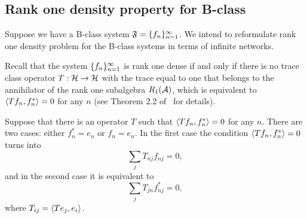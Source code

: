 \documentclass[12pt,oneside,a4paper]{amsart}
\begin{document}


    \medskip
    \subsection{Rank one density property for B-class}
      Suppose we have a B-class system $\fsys=\seq{f}$.
      We intend to reformulate rank one density problem for the B-class systems in terms of infinite networks.

      Recall that the system $\seq{f}$ is rank one dense
        if and only if there is no trace class operator $T: \cal{H} \to \cal{H}$ with the trace equal to one
        that belongs to the annihilator of the rank one subalgebra $R_1(\cal{A})$, which is equivalent to
        $\inner{Tf_n}{f_n^*} = 0$ for any $n$
        (see Theorem 2.2 of~\cite{katavolos} for details).

      Suppose that there is an operator $T$ such that $\inner{Tf_n}{f_n^*} = 0$ for any $n$.
      There are two cases: either $f^*_n = e_n$ or $f_n = e_n$.
      In the first case the condition $\inner{Tf_n}{f_n^*} = 0$ turns into
      \begin{equation}
          \label{left-eqn}
          \sum_j T_{nj} f_{nj} = 0,
      \end{equation}
      and in the second case it is equivalent to
      \begin{equation}
          \label{right-eqn}
          \sum_j T_{jn} f^*_{nj} = 0,
      \end{equation}
      where $T_{ij} = \inner{Te_j}{e_i}$.
\end{document}
